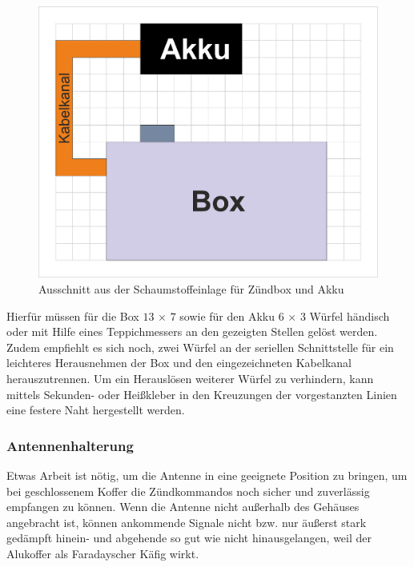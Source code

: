 \documentclass[paper=a4, parskip, numbers=noenddot, toc=listof, headsepline]{scrbook}
\begin{document}
				  \begin{figure}
					  \centering
					  \includegraphics[width=.7\textwidth]{Bilder/foamcut.png}
					  \caption{Ausschnitt aus der Schaumstoffeinlage für Zündbox und Akku}
					  \label{fig:foamcut}
				  \end{figure}

				  Hierfür müssen für die Box $13\,\times\,7$ sowie für den Akku $6\,\times\,3$ Würfel händisch oder mit Hilfe eines Teppichmessers an den gezeigten Stellen gelöst werden. Zudem empfiehlt es sich noch, zwei Würfel an der seriellen Schnittstelle für ein leichteres Herausnehmen der Box und den eingezeichneten Kabelkanal herauszutrennen. Um ein Herauslösen weiterer Würfel zu verhindern, kann mittels Sekunden- oder Heißkleber in den Kreuzungen der vorgestanzten Linien eine festere Naht hergestellt werden.

			  \subsubsection{Antennenhalterung}

				  Etwas Arbeit ist nötig, um die Antenne in eine geeignete Position zu bringen, um bei geschlossenem Koffer die Zündkommandos noch sicher und zuverlässig empfangen zu können. Wenn die Antenne nicht außerhalb des Gehäuses angebracht ist, können ankommende Signale nicht bzw. nur äußerst stark gedämpft hinein- und abgehende so gut wie nicht hinausgelangen, weil der Alukoffer als Faradayscher Käfig wirkt.
\end{document}
